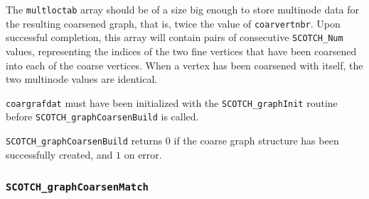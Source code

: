 \begin{itemize}
The {\tt multloctab} array should be of a size big enough to store
multinode data for the resulting coarsened graph, that is, twice the
value of {\tt coar\lbt vert\lbt nbr}. Upon successful completion,
this array will contain pairs of consecutive {\tt SCOTCH\_\lbt Num}
values, representing the indices of the two fine vertices that have
been coarsened into each of the coarse vertices. When a vertex has
been coarsened with itself, the two multinode values are identical.

{\tt coargrafdat} must have been initialized with the
{\tt SCOTCH\_\lbt graph\lbt Init} routine before
{\tt SCOTCH\_graph\lbt Coarsen\lbt Build} is called.

\progret

{\tt SCOTCH\_graphCoarsenBuild} returns $0$ if the coarse graph
structure has been successfully created, and $1$ on error.
\end{itemize}

\subsubsection{{\tt SCOTCH\_graphCoarsenMatch}}

